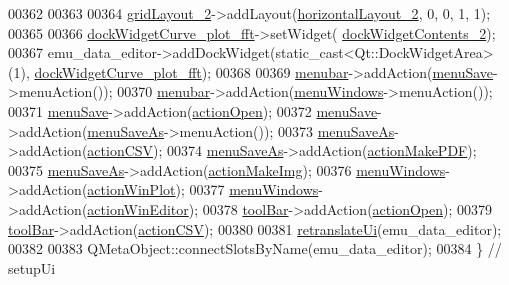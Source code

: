 \begin{DoxyCode}
00362 
00363 
00364         \hyperlink{a00079_ab6610272c6c39cba66cab113d98dcdcd}{gridLayout\_2}->addLayout(\hyperlink{a00079_aaee23fa38e3335cc652ebd35fcdbafc8}{horizontalLayout\_2}, 0, 0, 1, 1);
00365 
00366         \hyperlink{a00079_a7474d72172d9e269e8f3cb22bbe2fc86}{dockWidgetCurve\_plot\_fft}->setWidget(
      \hyperlink{a00079_ae304b249d83cb3152fbbf7a7d7e0e29b}{dockWidgetContents\_2});
00367         emu\_data\_editor->addDockWidget(static\_cast<Qt::DockWidgetArea>(1), 
      \hyperlink{a00079_a7474d72172d9e269e8f3cb22bbe2fc86}{dockWidgetCurve\_plot\_fft});
00368 
00369         \hyperlink{a00079_af09fe2fe1f34525f5caeb5ada7d297bf}{menubar}->addAction(\hyperlink{a00079_a36a184d4c55f5de1b542257cbe23adaf}{menuSave}->menuAction());
00370         \hyperlink{a00079_af09fe2fe1f34525f5caeb5ada7d297bf}{menubar}->addAction(\hyperlink{a00079_a0c7cba2d30d21689f48f1981e976c0b6}{menuWindows}->menuAction());
00371         \hyperlink{a00079_a36a184d4c55f5de1b542257cbe23adaf}{menuSave}->addAction(\hyperlink{a00079_a3ceb57268680eb23f6a3d522b303bb43}{actionOpen});
00372         \hyperlink{a00079_a36a184d4c55f5de1b542257cbe23adaf}{menuSave}->addAction(\hyperlink{a00079_a2568794cbc6cc9907104efbfd79eba7d}{menuSaveAs}->menuAction());
00373         \hyperlink{a00079_a2568794cbc6cc9907104efbfd79eba7d}{menuSaveAs}->addAction(\hyperlink{a00079_afae3d61aac77b6c20a7953b3adba9672}{actionCSV});
00374         \hyperlink{a00079_a2568794cbc6cc9907104efbfd79eba7d}{menuSaveAs}->addAction(\hyperlink{a00079_af013c084ff0ed9ae39a60aa7a39bdd91}{actionMakePDF});
00375         \hyperlink{a00079_a2568794cbc6cc9907104efbfd79eba7d}{menuSaveAs}->addAction(\hyperlink{a00079_a345313e538e5ef49cd27c1fc0bdd4173}{actionMakeImg});
00376         \hyperlink{a00079_a0c7cba2d30d21689f48f1981e976c0b6}{menuWindows}->addAction(\hyperlink{a00079_a0aeb289d8df9db6f4329e9000e44d511}{actionWinPlot});
00377         \hyperlink{a00079_a0c7cba2d30d21689f48f1981e976c0b6}{menuWindows}->addAction(\hyperlink{a00079_aa5d56420958ab4fd1239e29714d75e18}{actionWinEditor});
00378         \hyperlink{a00079_a884ecf47fc47f20bd60e9406b1ef88f1}{toolBar}->addAction(\hyperlink{a00079_a3ceb57268680eb23f6a3d522b303bb43}{actionOpen});
00379         \hyperlink{a00079_a884ecf47fc47f20bd60e9406b1ef88f1}{toolBar}->addAction(\hyperlink{a00079_afae3d61aac77b6c20a7953b3adba9672}{actionCSV});
00380 
00381         \hyperlink{a00079_a4118bb421fd84731231aa1429fedf5f8}{retranslateUi}(emu\_data\_editor);
00382 
00383         QMetaObject::connectSlotsByName(emu\_data\_editor);
00384     \} \textcolor{comment}{// setupUi}
\end{DoxyCode}


